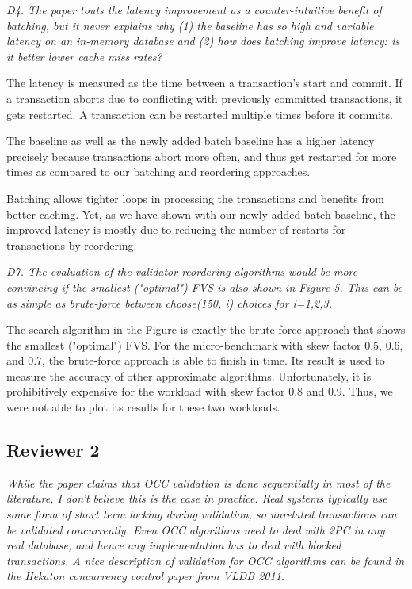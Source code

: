 \documentclass{article}
\begin{document}
\emph{D4. The paper touts the latency improvement as a counter-intuitive benefit of batching, but it never explains why (1) the baseline has so high and variable latency on an in-memory database and (2) how does batching improve latency: is it better lower cache miss rates?}

The latency is measured as the time between a transaction's start and commit. If a transaction aborts due to conflicting with previously committed transactions, it gets restarted. A transaction can be restarted multiple times before it commits. 

The baseline as well as the newly added batch baseline has a higher latency precisely because transactions abort more often, and thus get restarted for more times as compared to our batching and reordering approaches. 

Batching allows tighter loops in processing the transactions and benefits from better caching. Yet, as we have shown with our newly added batch baseline, the improved latency is mostly due to reducing the number of restarts for transactions by reordering.

\emph{D7. The evaluation of the validator reordering algorithms would be more convincing if the smallest ("optimal") FVS is also shown in Figure 5. This can be as simple as brute-force between choose(150, i) choices for i=1,2,3.}

The search algorithm in the Figure is exactly the brute-force approach that shows the smallest ("optimal") FVS. For the micro-benchmark with skew factor 0.5, 0.6, and 0.7, the brute-force approach is able to finish in time. Its result is used to measure the accuracy of other approximate algorithms. Unfortunately, it is prohibitively expensive for the workload with skew factor 0.8 and 0.9. Thus, we were not able to plot its results for these two workloads.

\subsection{Reviewer 2}


\emph{While the paper claims that OCC validation is done sequentially in most of the literature, I don't believe this is the case in practice. Real systems typically use some form of short term locking during validation, so unrelated transactions can be validated concurrently. Even OCC algorithms need to deal with 2PC in any real database, and hence any implementation has to deal with blocked transactions. A nice description of validation for OCC algorithms can be found in the Hekaton concurrency control paper from VLDB 2011. }
\end{document}
